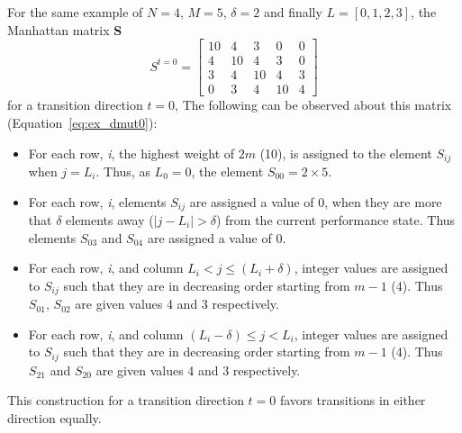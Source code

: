 For the same example of $N = 4$, $M = 5$, $\delta = 2$ and finally $L = [0,1,2,3]$, 
the Manhattan matrix \textbf{S}
\begin{equation}
    S^{t = 0} = \left[
     \begin{array}{ccccc}
       10 & 4 & 3 & 0 & 0 \\
       4 & 10 & 4 & 3 & 0 \\
       3 & 4 & 10 & 4 & 3 \\
       0 & 3 & 4 & 10 & 4
     \end{array}
   \right]
\label{eq:ex_dmut0}
\end{equation}
 for a transition direction $t = 0$, The following can be observed about this matrix (Equation~\eqref{eq:ex_dmut0}):
\begin{itemize}
\item For each row, \textit{i}, the highest weight of $2m$ (10), is assigned to the element 
$S_{ij}$ when $j = L_i$. Thus, as $L_0 = 0$, the element $S_{00} = 2 \times 5$.
\item For each row, \textit{i}, elements $S_{ij}$ are assigned a value of 0, 
when they are more that $\delta$ elements away ($|j - L_i| > \delta$) from the current performance state. 
Thus elements $S_{03}$ and $S_{04}$ are assigned a value of 0.
\item For each row, \textit{i}, and column $L_i < j \leq (L_i + \delta)$, integer values are assigned 
to $S_{ij}$ such that they are in decreasing order starting from $m-1$ (4).
Thus $S_{01}$, $S_{02}$ are given values 4 and 3 respectively. 
\item For each row, \textit{i}, and column $(L_i - \delta) \leq j < L_i$, integer values are assigned 
to $S_{ij}$ such that they are in decreasing order starting from $m-1$ (4).
Thus $S_{21}$ and $S_{20}$ are given values 4 and 3 respectively.
\end{itemize}
This construction for a transition direction $t = 0$ favors transitions in either direction equally. 

